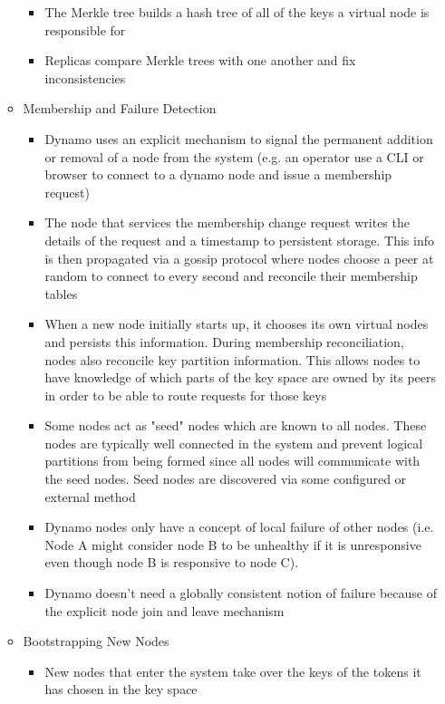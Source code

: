 \documentclass[a4paper]{article}
\begin{document}
\begin{itemize}
\begin{itemize}
\begin{itemize}
\item The Merkle tree builds a hash tree of all of the keys a virtual node is responsible for

\item Replicas compare Merkle trees with one another and fix inconsistencies
\end{itemize}

\item Membership and Failure Detection
\begin{itemize}
\item Dynamo uses an explicit mechanism to signal the permanent addition or removal of a node from the system (e.g. an operator use a CLI or browser to connect to a dynamo node and issue a membership request)

\item The node that services the membership change request writes the details of the request and a timestamp to persistent storage. This info is then propagated via a gossip protocol where nodes choose a peer at random to connect to every second and reconcile their membership tables

\item When a new node initially starts up, it chooses its own virtual nodes and persists this information. During membership reconciliation, nodes also reconcile key partition information. This allows nodes to have knowledge of which parts of the key space are owned by its peers in order to be able to route requests for those keys

\item Some nodes act as "seed" nodes which are known to all nodes. These nodes are typically well connected in the system and prevent logical partitions from being formed since all nodes will communicate with the seed nodes. Seed nodes are discovered via some configured or external method

\item Dynamo nodes only have a concept of local failure of other nodes (i.e. Node A might consider node B to be unhealthy if it is unresponsive even though node B is responsive to node C).

\item Dynamo doesn't need a globally consistent notion of failure because of the explicit node join and leave mechanism
\end{itemize}

\item Bootstrapping New Nodes
\begin{itemize}
\item New nodes that enter the system take over the keys of the tokens it has chosen in the key space


\end{itemize}
\end{itemize}
\end{itemize}
\end{document}
